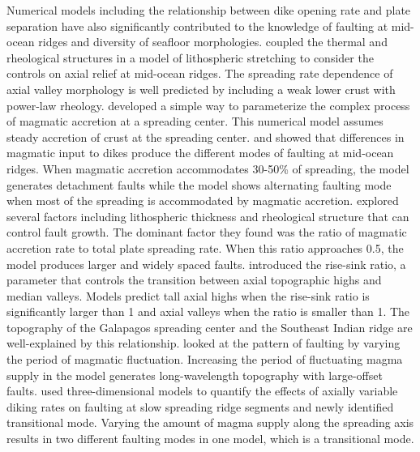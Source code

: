 \documentclass[letterpaper,12pt,notitle]{memphisthesis}                     %
\begin{document}
Numerical models including the relationship between dike opening rate and plate separation have also significantly contributed to the knowledge of faulting at mid-ocean ridges and diversity of seafloor morphologies. %
\citet{Chen1990} coupled the thermal and rheological structures in a model of lithospheric stretching to consider the controls on axial relief at mid-ocean ridges. The spreading rate dependence of axial valley morphology is well predicted by including a weak lower crust with power-law rheology. \citet{Buck1998} developed a simple way to parameterize the complex process of magmatic accretion at a spreading center. This numerical model assumes steady accretion of crust at the spreading center. \citet{Buck2005} and \citet{Tucholke2008} showed that differences in magmatic input to dikes produce the different modes of faulting at mid-ocean ridges. When magmatic accretion accommodates 30-50\% of spreading, the model generates detachment faults while the model shows alternating faulting mode when most of the spreading is accommodated by magmatic accretion. 
\citet{Behn2008} explored several factors including lithospheric thickness and rheological structure that can control fault growth. The dominant factor they found was the ratio of magmatic accretion rate to total plate spreading rate. When this ratio approaches 0.5, the model produces larger and widely spaced faults.
\citet{Ito2008} introduced the rise-sink ratio, a parameter that controls the transition between axial topographic highs and median valleys. Models predict tall axial highs when the rise-sink ratio is significantly larger than 1 and axial valleys when the ratio is smaller than 1. The topography of the Galapagos spreading center and the Southeast Indian ridge are well-explained by this relationship.
\citet{Olive2015} looked at the pattern of faulting by varying the period of magmatic fluctuation. Increasing the period of fluctuating magma supply in the model generates long-wavelength topography with large-offset faults.
\citet{Tian2017} used three-dimensional models to quantify the effects of axially variable diking rates on faulting at slow spreading ridge segments and newly identified transitional mode. Varying the amount of magma supply along the spreading axis results in two different faulting modes in one model, which is a transitional mode.
\end{document}
